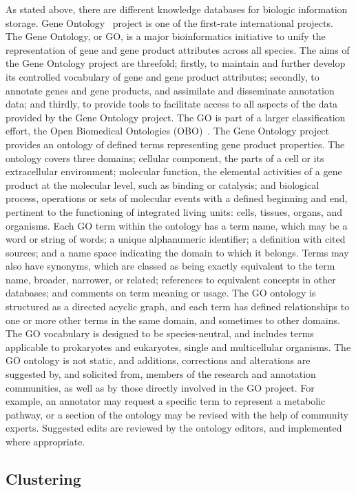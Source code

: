 As stated above, there are different knowledge databases for biologic information storage. Gene Ontology~\cite{GO_website} project is one of the first-rate international projects. The Gene Ontology, or GO, is a major bioinformatics initiative to unify the representation of gene and gene product attributes across all species. The aims of the Gene Ontology project are threefold; firstly, to maintain and further develop its controlled vocabulary of gene and gene product attributes; secondly, to annotate genes and gene products, and assimilate and disseminate annotation data; and thirdly, to provide tools to facilitate access to all aspects of the data provided by the Gene Ontology project. The GO is part of a larger classification effort, the Open Biomedical Ontologies (OBO)~\cite{OBO}. The Gene Ontology project provides an ontology of defined terms representing gene product properties. The ontology covers three domains; cellular component, the parts of a cell or its extracellular environment; molecular function, the elemental activities of a gene product at the molecular level, such as binding or catalysis; and biological process, operations or sets of molecular events with a defined beginning and end, pertinent to the functioning of integrated living units: cells, tissues, organs, and organisms. Each GO term within the ontology has a term name, which may be a word or string of words; a unique alphanumeric identifier; a definition with cited sources; and a name space indicating the domain to which it belongs. Terms may also have synonyms, which are classed as being exactly equivalent to the term name, broader, narrower, or related; references to equivalent concepts in other databases; and comments on term meaning or usage. The GO ontology is structured as a directed acyclic graph, and each term has defined relationships to one or more other terms in the same domain, and sometimes to other domains. The GO vocabulary is designed to be species-neutral, and includes terms applicable to prokaryotes and eukaryotes, single and multicellular organisms. The GO ontology is not static, and additions, corrections and alterations are suggested by, and solicited from, members of the research and annotation communities, as well as by those directly involved in the GO project. For example, an annotator may request a specific term to represent a metabolic pathway, or a section of the ontology may be revised with the help of community experts. Suggested edits are reviewed by the ontology editors, and implemented where appropriate.


\subsection{Clustering}
\label{sec:clustering}

